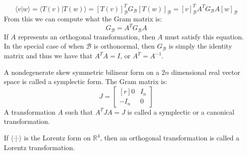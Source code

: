 \documentclass{article}                                                        %
\begin{document}
        \begin{equation}
            \langle{v}|w\rangle
            =\langle{T}(v)|T(w)\rangle
            =[T(v)]_{\mathscr{B}}^{T}G_{\mathscr{B}}[T(w)]_{\mathscr{B}}
            =[v]_{\mathscr{B}}^{T}A^{T}G_{\mathscr{B}}A[w]_{\mathscr{B}}
        \end{equation}
        From this we can compute what the Gram matrix is:
        \begin{equation}
            G_{\mathscr{B}}=A^{T}G_{\mathscr{B}}A
        \end{equation}
        If $A$ represents an orthogonal transformation, then $A$ must satisfy
        this equation. In the special case of when $\mathscr{B}$ is orthonormal,
        then $G_{\mathscr{B}}$ is simply the identity matrix and thus we have
        that $A^{T}A=I$, or $A^{T}=A^{\minus{1}}$.
        \par\hfill\par
        A nondegenerate skew symmetric bilinear form on a $2n$ dimensional real
        vector space is called a symplectic form. The Gram matrix is:
        \begin{equation}
            J=
            \begin{bmatrix*}[r]
                0&I_{n}\\
                \minus{I}_{n}&0
            \end{bmatrix*}
        \end{equation}
        A transformation $A$ such that $A^{T}JA=J$ is called a symplectic or
        a canonical transformation.
        \par\hfill\par
        If $\langle\cdot|\cdot\rangle$ is the Lorentz form on $\mathbb{R}^{4}$,
        then an orthogonal transformation is called a Lorentz transformation.
\end{document}
